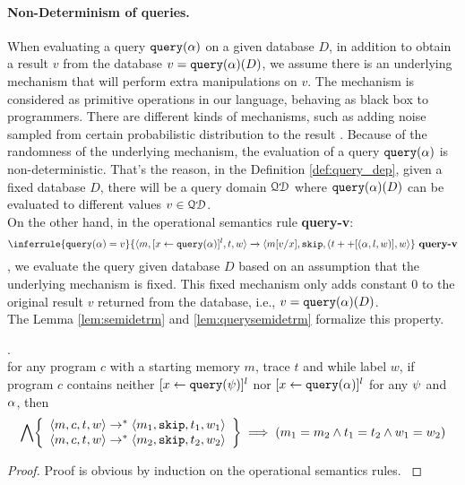 \documentclass[a4paper,11pt]{article}
\begin{document}
\paragraph{Non-Determinism of queries.}
% 
{
When evaluating a query ${\tt query}(\alpha)$ on a given database $D$, 
in addition to obtain a result $v$ from the database $v = {\tt query}(\alpha)(D)$,
we assume there is an underlying mechanism that will perform extra manipulations on $v$. 
The mechanism is considered as primitive operations in our language, behaving as black box to programmers.
There are different kinds of mechanisms, 
such as adding noise sampled from certain probabilistic distribution to the result \cite{dwork2015preserving}.
Because of the randomness of the underlying mechanism, the evaluation of a query ${\tt query}(\alpha)$ is non-deterministic. 
That's the reason, in the Definition \ref{def:query_dep}, given a fixed database $D$, there will be a query domain $\mathcal{QD}$ where ${\tt query}(\alpha)(D) $ can be evaluated to different values $v \in \mathcal{QD}$.
}
\\
{
On the other hand, in the operational semantics rule \textbf{query-v}:
\[
		\inferrule
	{
	\query(\qval) = v
	}
	{
	\config{m, [\assign{x}{\query(\qval)}]^l, t, w} 
	\xrightarrow{} 
	\config{m[ v/ x], \eskip,  (t ++ [(\qval, l, w)],w }
	}
	~\textbf{query-v}
	\]
, we evaluate the query given database $D$ based on an assumption that the underlying mechanism is fixed.
This fixed mechanism only adds constant $0$ to the original result $v$ returned from the database, i.e., $v = {\tt query}(\alpha)(D)$. 
}
%
\\
%
The Lemma \ref{lem:semidetrm} and \ref{lem:querysemidetrm} formalize this property.
%
\begin{lem}
.
\label{lem:semidetrm}\\
{
for any program $c$ with a starting memory $m$, trace $t$ and while label $w$, 
if program $c$ contains neither  
$[\mathrel{ x \leftarrow {\tt query}(\psi) }]^l$ nor $[\mathrel{ x \leftarrow {\tt query}(\alpha) }]^l$ for any $\psi$ and $\alpha$, then
%
$$
\bigwedge
\left\{\begin{array}{l}
\config{m, c, t, w} 
\rightarrow^{*} 
\config{m_1, \eskip, t_1, w_1} 
\\ 
\config{m, c, t, w} 
\rightarrow^{*} 
\config{m_2, \eskip, t_2, w_2} 
\end{array}
\right\}
\implies
(m_1 = m_2 \land t_1 = t_2 \land w_1 = w_2)
 $$ 
}
\end{lem}
%
\begin{proof}
{
Proof is obvious by induction on the operational semantics rules.
}
\end{proof}
\end{document}
